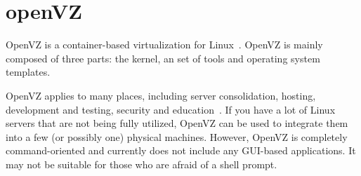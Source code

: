 \section{openVZ}

OpenVZ is a container-based virtualization for Linux~\cite{www-openvz}.
OpenVZ is mainly composed of three parts: the kernel, an set of tools
and operating system templates.

OpenVZ applies to many places, including server consolidation, hosting,
development and testing, security and education~\cite{www-openvz-intro}. 
If you have a lot of Linux servers that are not being fully utilized, 
OpenVZ can be used to integrate them into a few (or possibly one) 
physical machines. However, OpenVZ is completely command-oriented 
and currently does not include any GUI-based applications. It may not
be suitable for those who are afraid of a shell prompt.

